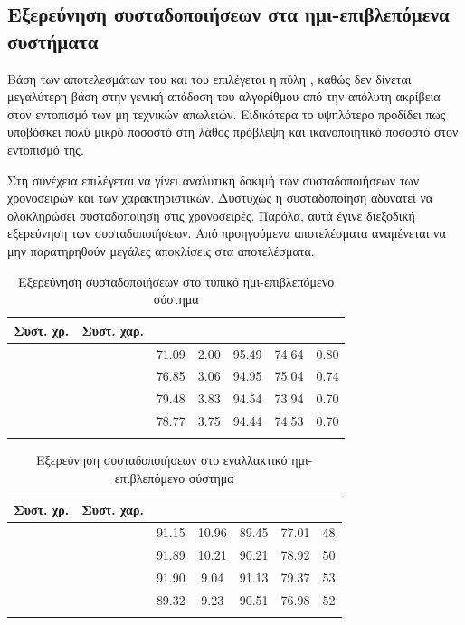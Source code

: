 \subsection{Εξερεύνηση συσταδοποιήσεων στα ημι-επιβλεπόμενα συστήματα}
Βάση των αποτελεσμάτων του  και του  επιλέγεται η πύλη , καθώς δεν δίνεται μεγαλύτερη βάση στην γενική απόδοση του αλγορίθμου από την απόλυτη ακρίβεια στον εντοπισμό των μη τεχνικών απωλειών. Ειδικότερα το υψηλότερο  προδίδει πως υποβόσκει πολύ μικρό ποσοστό στη λάθος πρόβλεψη και ικανοποιητικό ποσοστό στον εντοπισμό της.\par
Στη συνέχεια επιλέγεται να γίνει αναλυτική δοκιμή των συσταδοποιήσεων των χρονοσειρών και των χαρακτηριστικών. Δυστυχώς η συσταδοποίηση  αδυνατεί να ολοκληρώσει συσταδοποίηση στις χρονοσειρές. Παρόλα, αυτά έγινε διεξοδική εξερεύνηση των συσταδοποιήσεων. Από προηγούμενα αποτελέσματα αναμένεται να μην παρατηρηθούν μεγάλες αποκλίσεις στα αποτελέσματα.
\begin{center}
    \begin{longtabu} to 0.8\textwidth { | c | c || c | c | c | c | c |  }
 \hline
 Συστ. χρ.&Συστ. χαρ.&   &  &  &  & \\
\hline
{}& & 71.09 & 2.00 & 95.49 & 74.64 & 0.80\\
 \hline
 && 76.85 & 3.06 & 94.95 & 75.04 & 0.74\\ 
\hline
{}& &79.48& 3.83 & 94.54 & 73.94 & 0.70\\ 
 \hline
 & & 78.77 & 3.75 & 94.44 & 74.53 & 0.70\\
\hline
\caption{Εξερεύνηση συσταδοποιήσεων στο τυπικό ημι-επιβλεπόμενο σύστημα}
\label{tab:testclustersemisup1}
\end{longtabu}
\end{center}

\begin{center}
\begin{longtabu} to 0.8\textwidth { | c | c || c | c | c | c | c |   }
 \hline
 Συστ. χρ.& Συστ. χαρ.&   &  &  &  & \\
\hline
{} && 91.15 & 10.96  & 89.45 & 77.01 & 48\\
 \hline
 &&  91.89 & 10.21  & 90.21 & 78.92 & 50\\ 
\hline
{}& &91.90 & 9.04  & 91.13 & 79.37 & 53\\ 
 \hline
 & & 89.32 & 9.23  & 90.51 & 76.98 & 52\\
\hline
\caption{Εξερεύνηση συσταδοποιήσεων στο εναλλακτικό ημι-επιβλεπόμενο σύστημα}
\label{tab:testclustersemisup2}
\end{longtabu}
\end{center}
